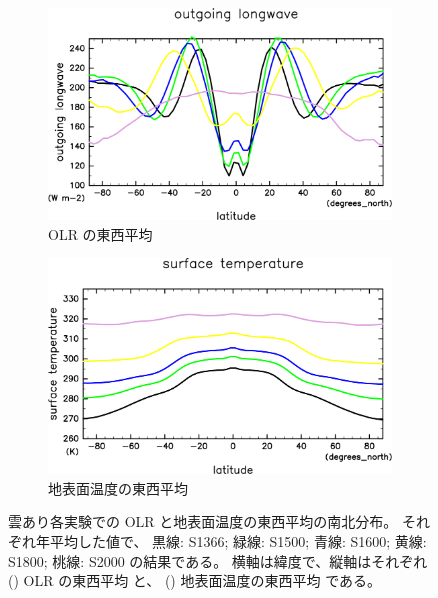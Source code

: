 \documentclass[body]{subfiles}
\begin{document}
\begin{figure}[t]
	\centering
	\begin{subfigure}{.45\textwidth}
		\centering
		\includegraphics[width=\textwidth]{OLR-overplot-crop-rotate.pdf}
		\caption{OLR の東西平均}\label{OLRA東西平均}
	\end{subfigure}
	\hfill
	\begin{subfigure}{.45\textwidth}
		\centering
		\includegraphics[width=\textwidth]{SurfTemp-overplot-crop-rotate.pdf}
		\caption{地表面温度の東西平均}\label{地表面温度}
	\end{subfigure}
	\caption[雲あり各実験での OLR と地表面温度の東西平均]{
		雲あり各実験での OLR と地表面温度の東西平均の南北分布。
		それぞれ年平均した値で、
		黒線: S1366; 緑線: S1500; 青線: S1600; 黄線: S1800; 桃線: S2000 の結果である。
		横軸は緯度で、縦軸はそれぞれ () OLR の東西平均 \hmu*{[W/m^2]}と、
		() 地表面温度の東西平均 \hmu*{[K]} である。
	}
\end{figure}
\end{document}
